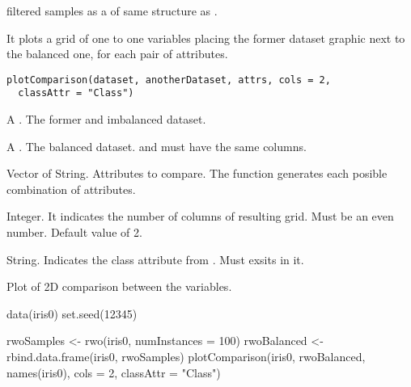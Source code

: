 %
\begin{Value}
filtered samples as a  of same structure as
.
\end{Value}
%
\begin{Examples}
\end{Examples}
%
\begin{Description}\relax
It plots a grid of one to one variables placing the former dataset graphic
next to the balanced one, for each pair of attributes.
\end{Description}
%
\begin{Usage}
\begin{verbatim}
plotComparison(dataset, anotherDataset, attrs, cols = 2,
  classAttr = "Class")
\end{verbatim}
\end{Usage}
%
\begin{Arguments}
\begin{ldescription}
\item[\code{dataset}] A . The former and imbalanced dataset.

\item[\code{anotherDataset}] A . The balanced dataset. 
and  must have the same columns.

\item[\code{attrs}] Vector of String. Attributes to compare. The function generates
each posible combination of attributes.

\item[\code{cols}] Integer. It indicates the number of columns of resulting grid.
Must be an even number. Default value of 2.

\item[\code{classAttr}] String. Indicates the class attribute from .
Must exsits in it.
\end{ldescription}
\end{Arguments}
%
\begin{Value}
Plot of 2D comparison between the variables.
\end{Value}
%
\begin{Examples}
\begin{ExampleCode}
data(iris0)
set.seed(12345)

rwoSamples <- rwo(iris0, numInstances = 100)
rwoBalanced <- rbind.data.frame(iris0, rwoSamples)
plotComparison(iris0, rwoBalanced, names(iris0), cols = 2, classAttr = "Class")

\end{ExampleCode}
\end{Examples}
